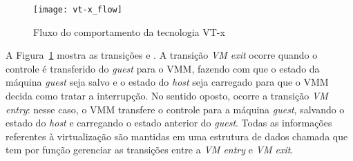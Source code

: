 \begin{figure}[!h]
  \centering
  \texttt{[image: vt-x\_flow]} 
  \caption{Fluxo do comportamento da tecnologia VT-x}
  \label{fig:vt-x_flow}
\end{figure}

A Figura~\ref{fig:vt-x_flow} mostra as transições  e
. A transição \emph{VM exit} ocorre quando o controle é
transferido do \emph{guest} para o VMM, fazendo com que o estado da máquina
\emph{guest} seja salvo e o estado do \emph{host} seja carregado para que o VMM
decida como tratar a interrupção. No sentido oposto, ocorre a transição
\emph{VM entry}: nesse caso, o VMM transfere o controle para a máquina
\emph{guest}, salvando o estado do \emph{host} e carregando o estado
anterior do \emph{guest}. Todas as informações referentes à virtualização são
mantidas em uma estrutura de dados chamada  que tem por função gerenciar as transições entre a
\emph{VM entry} e \emph{VM exit}.
